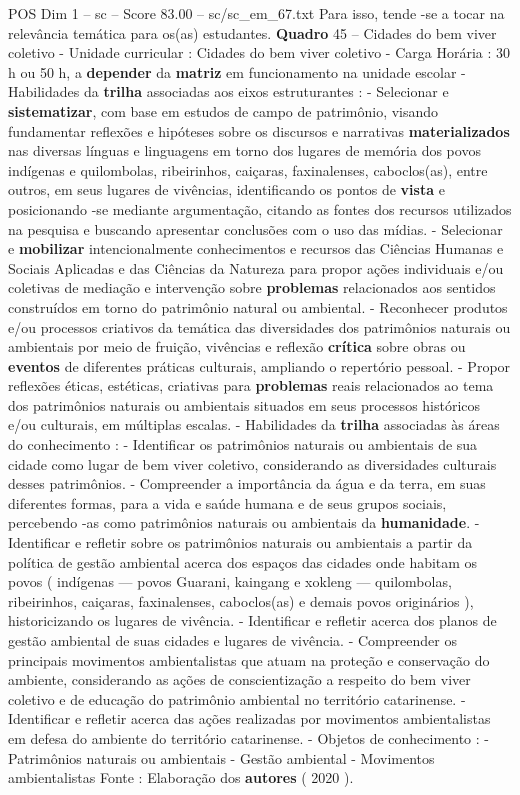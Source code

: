 \begin{textsample}{POS Dim 1 – sc – Score 83.00 – sc/sc\_em\_67.txt}
Para isso, tende -se a tocar na relevância temática para os(as) estudantes. \textbf{Quadro} 45 – Cidades do bem viver coletivo - Unidade curricular : Cidades do bem viver coletivo - Carga Horária : 30 h ou 50 h, a \textbf{depender} da \textbf{matriz} em funcionamento na unidade escolar - Habilidades da \textbf{trilha} associadas aos eixos estruturantes : - Selecionar e \textbf{sistematizar}, com base em estudos de campo de patrimônio, visando fundamentar reflexões e hipóteses sobre os discursos e narrativas \textbf{materializados} nas diversas línguas e linguagens em torno dos lugares de memória dos povos indígenas e quilombolas, ribeirinhos, caiçaras, faxinalenses, caboclos(as), entre outros, em seus lugares de vivências, identificando os pontos de \textbf{vista} e posicionando -se mediante argumentação, citando as fontes dos recursos utilizados na pesquisa e buscando apresentar conclusões com o uso das mídias. - Selecionar e \textbf{mobilizar} intencionalmente conhecimentos e recursos das Ciências Humanas e Sociais Aplicadas e das Ciências da Natureza para propor ações individuais e/ou coletivas de mediação e intervenção sobre \textbf{problemas} relacionados aos sentidos construídos em torno do patrimônio natural ou ambiental. - Reconhecer produtos e/ou processos criativos da temática das diversidades dos patrimônios naturais ou ambientais por meio de fruição, vivências e reflexão \textbf{crítica} sobre obras ou \textbf{eventos} de diferentes práticas culturais, ampliando o repertório pessoal. - Propor reflexões éticas, estéticas, criativas para \textbf{problemas} reais relacionados ao tema dos patrimônios naturais ou ambientais situados em seus processos históricos e/ou culturais, em múltiplas escalas. - Habilidades da \textbf{trilha} associadas às áreas do conhecimento : - Identificar os patrimônios naturais ou ambientais de sua cidade como lugar de bem viver coletivo, considerando as diversidades culturais desses patrimônios. - Compreender a importância da água e da terra, em suas diferentes formas, para a vida e saúde humana e de seus grupos sociais, percebendo -as como patrimônios naturais ou ambientais da \textbf{humanidade}. - Identificar e refletir sobre os patrimônios naturais ou ambientais a partir da política de gestão ambiental acerca dos espaços das cidades onde habitam os povos ( indígenas — povos Guarani, kaingang e xokleng — quilombolas, ribeirinhos, caiçaras, faxinalenses, caboclos(as) e demais povos originários ), historicizando os lugares de vivência. - Identificar e refletir acerca dos planos de gestão ambiental de suas cidades e lugares de vivência. - Compreender os principais movimentos ambientalistas que atuam na proteção e conservação do ambiente, considerando as ações de conscientização a respeito do bem viver coletivo e de educação do patrimônio ambiental no território catarinense. - Identificar e refletir acerca das ações realizadas por movimentos ambientalistas em defesa do ambiente do território catarinense. - Objetos de conhecimento : - Patrimônios naturais ou ambientais - Gestão ambiental - Movimentos ambientalistas Fonte : Elaboração dos \textbf{autores} ( 2020 ).

\end{textsample}
